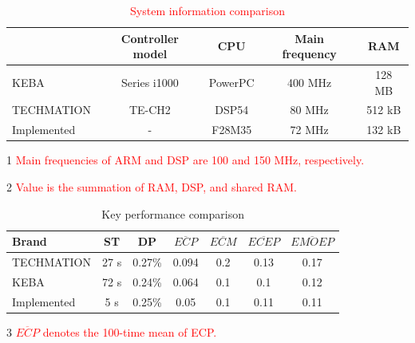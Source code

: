 \documentclass[journal,UTF8]{IEEEtran}
\begin{document}
	\begin{table}
		\scriptsize \caption{\textcolor{red}{System information comparison}}
		\label{table:systemComparison}
		\begin{center}
			\begin{threeparttable}
			\renewcommand{\arraystretch}{1.4}
			\setlength\tabcolsep{3pt}
			\begin{tabular}{|l|c|c|c|c|}	
				\hline
				            &Controller model &CPU     &Main frequency       &RAM\\
				\hline
				KEBA        &Series i1000     &PowerPC &400 MHz              &128 MB  \\
				\hline
				TECHMATION  &TE-CH2           &DSP54    &80 MHz              &512 kB  \\
				\hline
				Implemented &-                &F28M35  &72 MHz\tnote{1} &132 kB\tnote{2} \\
				\hline			
			\end{tabular}
			\begin{tablenotes}
			\footnotesize
			\item[1] \textcolor{red}{Main frequencies of ARM and DSP are 100 and 150 MHz, respectively.}
			\item[2] \textcolor{red}{Value is the summation of RAM, DSP, and shared RAM.}
			\end{tablenotes}
			\end{threeparttable}
		\end{center}
	\end{table}
	\begin{table}
		\scriptsize \caption{Key performance comparison}
		\label{table:ComparisonG}
		\begin{center}
		\begin{threeparttable}
			\renewcommand{\arraystretch}{1.4}
			\setlength\tabcolsep{3pt}
			\begin{tabular}{|l|c|c|c|c|c|c|}
				\hline
				Brand & ST &DP&$\overline{ECP}$ \tnote{3}&$\overline{ECM}$&$\overline{ECEP}$ &$\overline{EMOEP}$\\
				\hline
				TECHMATION  & 27 s  &0.27\% &0.094 & 0.2 & 0.13 & 0.17 \\
				\hline
				KEBA        & 72 s  &0.24\% &0.064 & 0.1 & 0.1 & 0.12 \\
				\hline
				Implemented   & 5 s     &0.25\% &0.05 & 0.1 & 0.11 & 0.11\\
				\hline
			\end{tabular}
			\begin{tablenotes}
			\footnotesize
			\item[3] \textcolor{red}{$\overline{ECP}$ denotes the 100-time mean of ECP.}
		    \end{tablenotes}
		\end{threeparttable}
	\end{center}
	\end{table}
\end{document}
